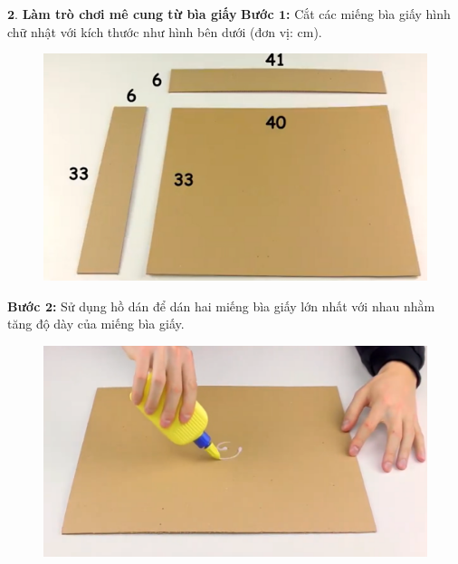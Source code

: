 \begin{multicols}{2}
	$\pmb{2.}$ \textbf{\color{toancuabi}Làm trò chơi mê cung từ bìa giấy}
	\vskip 0.1cm
	\textbf{\color{toancuabi}Bước $\pmb{1}$:} Cắt các miếng bìa giấy hình chữ nhật với kích thước như hình bên dưới (đơn vị: cm).
	\begin{figure}[H]
		\vspace*{-5pt}
		\centering
		\captionsetup{labelformat= empty, justification=centering}
		\includegraphics[width= 0.85\linewidth]{1}
		\vspace*{-10pt}
	\end{figure}
	\textbf{\color{toancuabi}Bước $\pmb{2}$:} Sử dụng hồ dán để dán hai miếng bìa giấy lớn nhất với nhau nhằm tăng độ dày của miếng bìa giấy.
	\begin{figure}[H]
		\vspace*{-5pt}
		\centering
		\captionsetup{labelformat= empty, justification=centering}
		\includegraphics[width=0.85\linewidth]{2}
		

\end{figure}
\end{multicols}
